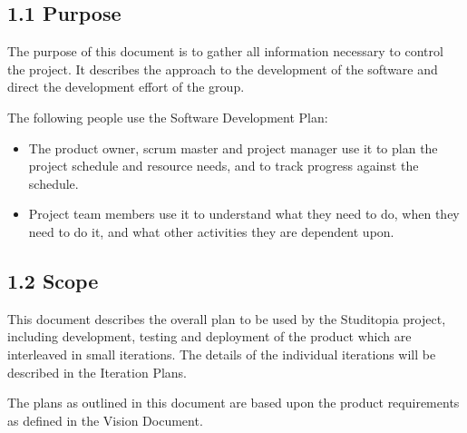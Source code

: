 \documentclass[12pt]{article}
\begin{document}
\subsection*{1.1 Purpose}
\par\medskip
The purpose of this document is to gather all information necessary to control the project. It describes the approach to the development of the software and direct the development effort of the group.
\par\medskip
The following people use the Software Development Plan:
\par\medskip
\begin{itemize}
\item The product owner, scrum master and project manager use it to plan the project schedule and resource needs, and to track progress against the schedule.
\par
\item Project team members use it to understand what they need to do, when they need to do it, and what other activities they are dependent upon.
\par
\end{itemize}
\hypertarget{sec:12-scope}{}
\subsection*{1.2 Scope}
\par\medskip
This document describes the overall plan to be used by the Studitopia project, including development, testing and deployment of the product which are interleaved in small iterations. The details of the individual iterations will be described in the Iteration Plans.
\par\medskip
The plans as outlined in this document are based upon the product requirements as defined in the Vision Document.
\par\medskip
\hypertarget{sec:13-overview}{}
\end{document}
